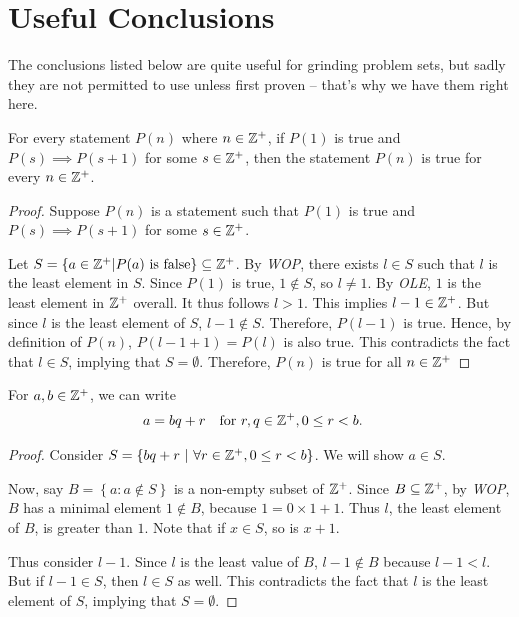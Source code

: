 \section{Useful Conclusions}

The conclusions listed below are quite useful for grinding problem sets, but sadly they are not permitted to use unless first proven – that's why we have them right here.

\begin{theorem**}[Induction]
For every statement $P(n)$ where $n \in \mathbb{Z}^+$, if $P(1)$ is true and $P(s)\implies P(s+1)$ for some $s \in \mathbb{Z}^+$, then the statement $P(n)$ is true for every $n \in \mathbb{Z}^+$.
\end{theorem**}
\begin{proof}
    Suppose $P(n)$ is a statement such that $P(1)$ is true and $P(s)\implies P(s+1)$ for some $s \in \mathbb{Z}^+$.
    
    Let $S = \left\{ a\in \mathbb{Z}^+ \vert P(a) \text{ is false} \right\} \subseteq \mathbb{Z}^+$. By \textit{WOP}, there exists $l \in S$ such that $l$ is the least element in $S$. Since $P(1)$ is true, $1 \notin S$, so $l \neq 1$. By \textit{OLE}, $1$ is the least element in $\mathbb{Z}^+$ overall. It thus follows $l > 1$. This implies $l-1 \in \mathbb{Z}^+$. But since $l$ is the least element of $S$, $l-1 \notin S$. Therefore, $P(l-1)$ is true. Hence, by definition of $P(n)$, $P(l-1+1) = P(l)$ is also true. This contradicts the fact that $l \in S$, implying that $S = \emptyset$. Therefore, $P(n)$ is true for all $n \in \mathbb{Z}^+$
\end{proof}
\begin{theorem**}
For $a, b \in \mathbb{Z}^{+}$, we can write
\begin{align*}
    a &= bq+r \text{\quad for $r, q \in \mathbb{Z}^{+}, 0\leq r < b$}.
\end{align*}
\end{theorem**}
\begin{proof}
    Consider $S = \left\{bq+r\ \vert\ \forall r \in \Zplus, 0\leq r < b\right\}$. We will show $a \in S$.

    Now, say $B = \left\{ a: a \notin S \right\}$ is a non-empty subset of $\mathbb{Z}^{+}$. Since $B\subseteq \mathbb{Z}^{+}$, by \textit{WOP}, $B$ has a minimal element $1 \notin B$, because $1 = 0\times 1 + 1$. Thus $l$, the least element of $B$, is greater than $1$. Note that if $x \in S$, so is $x+1$.

    Thus consider $l - 1$. Since $l$ is the least value of $B$, $l-1 \notin B$ because $l-1 < l$. But if $l-1 \in S$, then $l \in S$ as well. This contradicts the fact that $l$ is the least element of $S$, implying that $S = \emptyset$.
\end{proof}

